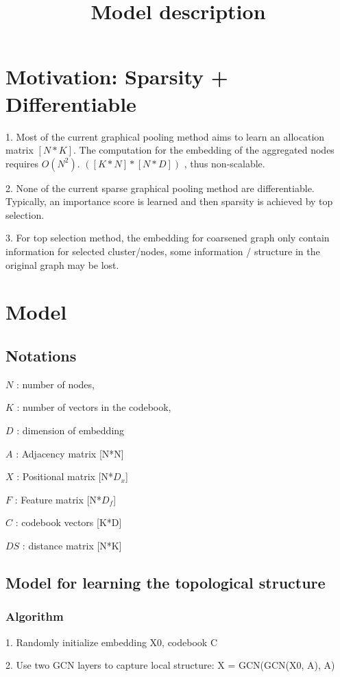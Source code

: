 \documentclass[12pt]{amsart}
\title{Model description}
\author{}
\begin{document}
\maketitle
\section{Motivation: Sparsity + Differentiable}
1.
Most of the current graphical pooling method aims to learn an allocation matrix $[N*K]$. 
The computation for the embedding of the aggregated nodes requires $O(N^2)$. $([K*N] * [N*D])$
, thus non-scalable.

2.
None of the current sparse graphical pooling method are differentiable.
Typically, an importance score is learned and then sparsity is achieved by top selection.

3.
For top selection method, the embedding for coarsened graph only contain information for selected cluster/nodes,
some information / structure in the original graph may be lost.


\section{Model}
\subsection{Notations} 
\hfill

$N$ : number of nodes, 

$K$ : number of vectors in the codebook,

$D$ : dimension of embedding

$A$ : Adjacency matrix [N*N]

$X$ : Positional matrix [N*$D_x$]

$F$ : Feature matrix [N*$D_f$]

$C$ : codebook vectors [K*D]

$DS$ : distance matrix [N*K]


\subsection{Model for learning the topological structure}
\subsubsection{Algorithm}
\hfill

1. Randomly initialize embedding X0, codebook C

2. Use two GCN layers to capture local structure: X = GCN(GCN(X0, A), A)
\end{document}

